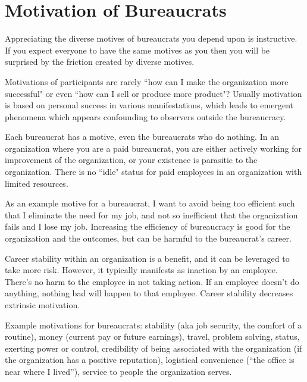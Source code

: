 \section{Motivation of Bureaucrats\label{sec:motivations}}

Appreciating the diverse motives of bureaucrats you depend upon is instructive. If you expect everyone to have the same motives as you then you will be surprised by the friction created by diverse motives. 

Motivations of participants are rarely ``how can I make the organization more successful" or even ``how can I sell or produce more product"? Usually motivation is based on personal success in various manifestations, which leads to emergent phenomena which appears confounding to observers outside the bureaucracy. 



Each bureaucrat has a motive, even the bureaucrats who do nothing. 
In an organization where you are a paid bureaucrat, you are either actively working for improvement of the organization, or your existence is parasitic to the organization. There is no ``idle" status for paid employees in an organization with limited resources.

As an example motive for a bureaucrat, I want to avoid being too efficient such that I eliminate the need for my job, and not so inefficient that the organization fails and I lose my job. Increasing the efficiency of bureaucracy is good for the organization and the outcomes, but can be harmful to the bureaucrat's career.

Career stability within an organization is a benefit, and it can be leveraged to take more risk. However, it typically manifests as inaction by an employee. There's no harm to the employee in not taking action. If an employee doesn't do anything, nothing bad will happen to that employee. Career stability decreases extrinsic motivation.


Example motivations for bureaucrats: 
stability (aka job security, the comfort of a routine),
money (current pay or future earnings), 
travel, 
problem solving, 
status, 
exerting power or control, 
credibility of being associated with the organization (if the organization has a positive reputation), 
logistical convenience (``the office is near where I lived''), 
service to people the organization serves.



